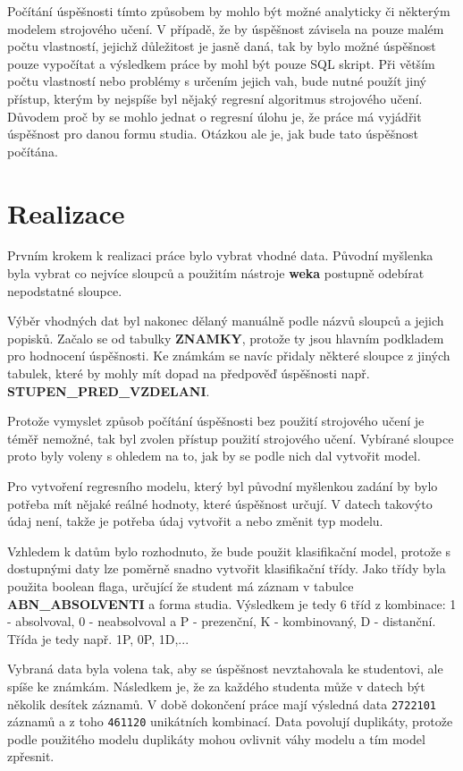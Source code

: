 \documentclass[12pt, letterpaper]{article}
\begin{document}
Počítání úspěšnosti tímto způsobem by mohlo být možné analyticky či některým modelem strojového učení. V případě, že by
úspěšnost závisela na pouze malém počtu vlastností, jejichž důležitost je jasně daná, tak by bylo možné úspěšnost 
pouze vypočítat a výsledkem práce by mohl být pouze SQL skript. Při větším počtu vlastností nebo problémy s určením
jejich vah, bude nutné použít jiný přístup, kterým by nejspíše byl nějaký regresní algoritmus strojového učení. Důvodem
proč by se mohlo jednat o regresní úlohu je, že práce má vyjádřit úspěšnost pro danou formu studia. Otázkou ale je,
jak bude tato úspěšnost počítána.
\section{Realizace}
Prvním krokem k realizaci práce bylo vybrat vhodné data. Původní myšlenka byla vybrat co nejvíce sloupců a použitím 
nástroje \textbf{weka} postupně odebírat nepodstatné sloupce.

Výběr vhodných dat byl nakonec dělaný manuálně podle názvů sloupců a jejich popisků. Začalo se od tabulky 
\textbf{ZNAMKY}, protože ty jsou hlavním podkladem pro hodnocení úspěšnosti. Ke známkám se navíc přidaly některé
sloupce z jiných tabulek, které by mohly mít dopad na předpověď úspěšnosti např. \textbf{STUPEN\_PRED\_VZDELANI}.

Protože vymyslet způsob počítání úspěšnosti bez použití strojového učení je téměř nemožné, tak byl zvolen přístup
použití strojového učení. Vybírané sloupce proto byly voleny s ohledem na to, jak by se podle nich dal vytvořit model.

Pro vytvoření regresního modelu, který byl původní myšlenkou zadání by bylo potřeba mít nějaké reálné hodnoty, které 
úspěšnost určují. V datech takovýto údaj není, takže je potřeba údaj vytvořit a nebo změnit typ modelu.

Vzhledem k datům bylo rozhodnuto, že bude použit klasifikační model, protože s dostupnými daty lze poměrně snadno
vytvořit klasifikační třídy. Jako třídy byla použita boolean flaga, určující že student má záznam v tabulce 
\textbf{ABN\_ABSOLVENTI} a forma studia. Výsledkem je tedy 6 tříd z kombinace: 1 - absolvoval, 0 - neabsolvoval a 
P - prezenční, K - kombinovaný, D - distanční. Třída je tedy např. 1P, 0P, 1D,...

Vybraná data byla volena tak, aby se úspěšnost nevztahovala ke studentovi, ale spíše ke známkám. Následkem je, 
že za každého studenta může v datech být několik desítek záznamů. V době dokončení práce mají výsledná data 
\texttt{2722101} záznamů a z toho \texttt{461120} unikátních kombinací. Data povolují duplikáty, protože 
podle použitého modelu duplikáty mohou ovlivnit váhy modelu a tím model zpřesnit.
\end{document}
